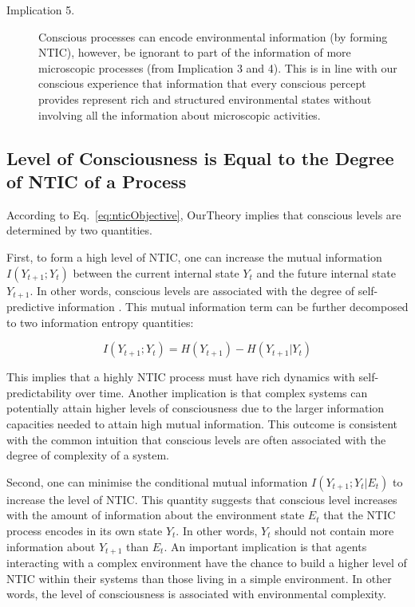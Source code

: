 \documentclass[utf8]{article}
\begin{document}
\begin{description}
            \item[Implication 5.]
            Conscious processes can encode environmental information (by forming NTIC), however, be ignorant to part of the information of more microscopic processes (from Implication 3 and 4). This is in line with our conscious experience that information that every conscious percept provides represent rich and structured environmental states without involving all the information about microscopic activities.
        \end{description}
		
		
	    \subsection{Level of Consciousness is Equal to the Degree of NTIC of a Process}\label{sec:cl}
            According to Eq.~\ref{eq:nticObjective}, \ac{OurTheory} implies that conscious levels are determined by two quantities. 
            
            First, to form a high level of NTIC, one can increase the mutual information $I(Y_{t+1};Y_{t})$ between the current internal state $Y_t$ and the future internal state $Y_{t+1}$. In other words, conscious levels are associated with the degree of self-predictive information \citep{bialek2001predictability}. This mutual information term can be further decomposed to two information entropy quantities: 
            
            \begin{equation}
            \label{eq:SelfEntropy}
            I(Y_{t+1};Y_{t}) = H(Y_{t+1}) - H(Y_{t+1}|Y_t)
            \end{equation}
            
            This implies that a highly NTIC process must have rich dynamics with self-predictability over time. Another implication is that complex systems can potentially attain higher levels of consciousness due to the larger information capacities needed to attain high mutual information. This outcome is consistent with the common intuition that conscious levels are often associated with the degree of complexity of a system.
    
    	    Second, one can minimise the conditional mutual information $I(Y_{t+1};Y_{t}|E_{t})$ to increase the level of NTIC. This quantity suggests that conscious level increases with the amount of information about the environment state $E_t$ that the NTIC process encodes in its own state $Y_t$. In other words, $Y_t$ should not contain more information about $Y_{t+1}$ than $E_t$. An important implication is that agents interacting with a complex environment have the chance to build a higher level of NTIC within their systems than those living in a simple environment. In other words, the level of consciousness is associated with environmental complexity. 
    	   
\end{document}
